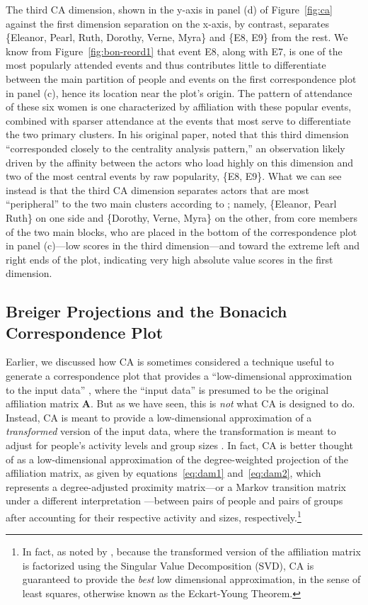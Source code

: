 \documentclass[a4paper,fleqn]{cas-sc}
\begin{document}
The third CA dimension, shown in the y-axis in panel (d) of Figure~\ref{fig:ca} against the first dimension separation on the x-axis, by contrast, separates \{Eleanor, Pearl, Ruth, Dorothy, Verne, Myra\} and \{E8, E9\} from the rest. We know from Figure~\ref{fig:bon-reord1} that event E8, along with E7, is one of the most popularly attended events and thus contributes little to differentiate between the main partition of people and events on the first correspondence plot in panel (c), hence its location near the plot's origin. The pattern of attendance of these six women is one characterized by affiliation with these popular events, combined with sparser attendance at the events that most serve to differentiate the two primary clusters. In his original paper, \citet[164]{bonacich1991simultaneous} noted that this third dimension ``corresponded closely to the centrality analysis pattern,'' an observation likely driven by the affinity between the actors who load highly on this dimension and two of the most central events by raw popularity, \{E8, E9\}. What we can see instead is that the third CA dimension separates actors that are most ``peripheral'' to the two main clusters according to \citet{freeman2003finding}; namely, \{Eleanor, Pearl Ruth\} on one side and \{Dorothy, Verne, Myra\} on the other, from core members of the two main blocks, who are placed in the bottom of the correspondence plot in panel (c)---low scores in the third dimension---and toward the extreme left and right ends of the plot, indicating very high absolute value scores in the first dimension. 

\subsection{Breiger Projections and the Bonacich Correspondence Plot} \label{sec:eigplot}
Earlier, we discussed how CA is sometimes considered a technique useful to generate a correspondence plot that provides a ``low-dimensional approximation to the input data'' \citep[125]{faust2005using}, where the ``input data'' is presumed to be the original affiliation matrix $\mathbf{A}$. But as we have seen, this is \textit{not} what CA is designed to do. Instead, CA is meant to provide a low-dimensional approximation of a \textit{transformed} version of the input data, where the transformation is meant to adjust for people's activity levels and group sizes \citep{desposito2014comparison}. In fact, CA is better thought of as a low-dimensional approximation of the degree-weighted projection of the affiliation matrix, as given by equations~\ref{eq:dam1} and~\ref{eq:dam2}, which represents a degree-adjusted proximity matrix---or a Markov transition matrix under a different interpretation \citep[2]{mealy2019interpreting}---between pairs of people and pairs of groups after accounting for their respective activity and sizes, respectively.\footnote{In fact, as noted by \citet[838]{martin2012extraordinary}, because the transformed version of the affiliation matrix is factorized using the Singular Value Decomposition (SVD), CA is guaranteed to provide the \textit{best} low dimensional approximation, in the sense of least squares, otherwise known as the Eckart-Young Theorem.}
\end{document}
